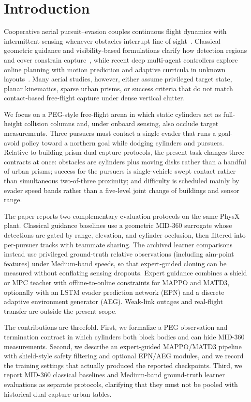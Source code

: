 \documentclass{SCIS2026}
\begin{document}
\section{Introduction}
Cooperative aerial pursuit--evasion couples continuous flight dynamics with intermittent sensing whenever obstacles interrupt line of sight~\cite{lavalle2006,bopardikar2008,zhou2016}. Classical geometric guidance and visibility-based formulations clarify how detection regions and cover constrain capture~\cite{gerkey2006,viper2025}, while recent deep multi-agent controllers explore online planning with motion prediction and adaptive curricula in unknown layouts~\cite{open2024,yu2022}. Many aerial studies, however, either assume privileged target state, planar kinematics, sparse urban prisms, or success criteria that do not match contact-based free-flight capture under dense vertical clutter.

We focus on a PEG-style free-flight arena in which static cylinders act as full-height collision columns and, under onboard sensing, also occlude target measurements. Three pursuers must contact a single evader that runs a goal-avoid policy toward a northern goal while dodging cylinders and pursuers. Relative to building-prism dual-capture protocols, the present task changes three contracts at once: obstacles are cylinders plus moving disks rather than a handful of urban prisms; success for the pursuers is single-vehicle swept contact rather than simultaneous two-of-three proximity; and difficulty is scheduled mainly by evader speed bands rather than a five-level joint change of buildings and sensor range.

The paper reports two complementary evaluation protocols on the same PhysX plant. Classical guidance baselines use a geometric MID-360 surrogate whose detections are gated by range, elevation, and cylinder occlusion, then filtered into per-pursuer tracks with teammate sharing. The archived learner comparisons instead use privileged ground-truth relative observations (including aim-point features) under Medium-band speeds, so that expert-guided cloning can be measured without conflating sensing dropouts. Expert guidance combines a shield or MPC teacher with offline-to-online constraints for MAPPO and MATD3, optionally with an LSTM evader prediction network (EPN) and a discrete adaptive environment generator (AEG). Weak-link outages and real-flight transfer are outside the present scope.

The contributions are threefold. First, we formalize a PEG observation and termination contract in which cylinders both block bodies and can hide MID-360 measurements. Second, we describe an expert-guided MAPPO/MATD3 pipeline with shield-style safety filtering and optional EPN/AEG modules, and we record the training settings that actually produced the reported checkpoints. Third, we report MID-360 classical baselines and Medium-band ground-truth learner evaluations as separate protocols, clarifying that they must not be pooled with historical dual-capture urban tables.
\end{document}

